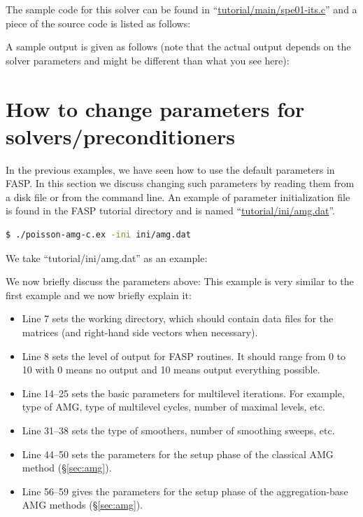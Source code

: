 \documentclass[11pt]{memoir}
\begin{document}
The sample code for this solver can be found in ``\url{tutorial/main/spe01-its.c}'' and a piece of the source code is listed as follows:
%

%
A sample output is given as follows (note that the actual output depends on the solver parameters and might be different than what you see here):


\section{How to change parameters for
  solvers/preconditioners}\label{sec:parameters}

In the previous examples, we have seen how to use the default parameters in FASP. In this section we discuss changing such parameters
by reading them from a disk file or from the command line. An example of parameter initialization file is found in the FASP
tutorial directory and is named ``\url{tutorial/ini/amg.dat}''.
%
\begin{lstlisting}[numbers=none,language=sh]
$ ./poisson-amg-c.ex -ini ini/amg.dat
\end{lstlisting}
%
We take ``tutorial/ini/amg.dat'' as an example:


We now briefly discuss the parameters above:
%
This example is very similar to the first example and we now briefly explain it:
\begin{itemize}
%
\item Line 7 sets the working directory, which should contain data files for the matrices (and right-hand side vectors when necessary).
%
\item Line 8 sets the level of output for FASP routines. It should range from 0 to 10 with 0 means no output and 10 means output everything possible.
%
\item Line 14--25 sets the basic parameters for multilevel iterations. For example, type of AMG, type of multilevel cycles, number of maximal levels, etc.
%
\item Line 31--38 sets the type of smoothers, number of smoothing sweeps, etc.
%
\item Line 44--50 sets the parameters for the setup phase of the classical AMG method (\S\ref{sec:amg}).
%
\item Line 56--59 gives the parameters for the setup phase of the aggregation-base AMG methods (\S\ref{sec:amg}).
%
\end{itemize}
%
\end{document}
